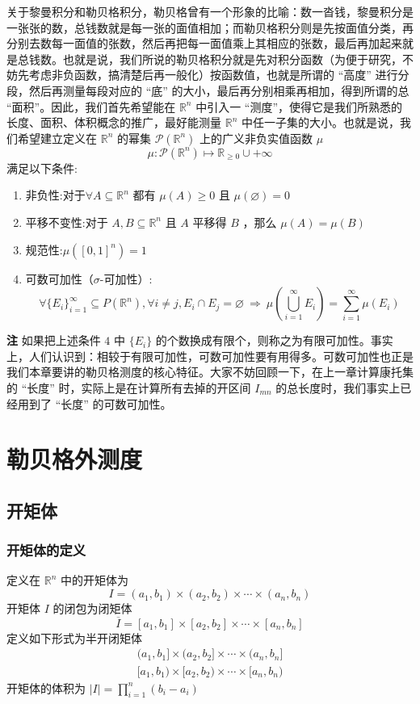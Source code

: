 \documentclass{ctexbook}
\newcommand{\R}{\mathbb{R}}
\newcommand{\ITEMS}{\begin{enumerate}[leftmargin=4em]}
\newcommand{\ITEME}{\end{enumerate}}
\begin{document}
关于黎曼积分和勒贝格积分，勒贝格曾有一个形象的比喻：数一沓钱，黎曼积分是一张张的数，总钱数就是每一张的面值相加；而勒贝格积分则是先按面值分类，再分别去数每一面值的张数，然后再把每一面值乘上其相应的张数，最后再加起来就是总钱数。也就是说，我们所说的勒贝格积分就是先对积分函数（为便于研究，不妨先考虑非负函数，搞清楚后再一般化）按函数值，也就是所谓的 “高度” 进行分段，然后再测量每段对应的 “底” 的大小，最后再分别相乘再相加，得到所谓的总 “面积”。因此，我们首先希望能在 $\R^n$ 中引入一 “测度”，使得它是我们所熟悉的长度、面积、体积概念的推广，最好能测量 $\R^n$ 中任一子集的大小。也就是说，我们希望建立定义在 $\R^n$ 的幂集 $\mathcal {P} (\R^n) $ 上的广义非负实值函数 $\mathcal {\mu}$
\[
\mathcal {\mu}:\mathcal {P} (\R^n)\mapsto \R_{\ge0} \cup {+\infty}
\]
满足以下条件:
\ITEMS
	\item 非负性:\quad 对于$\forall A \subseteq \R^n$ 都有 $\mathcal {\mu} (A) \ge 0$ 且 $\mathcal {\mu}(\varnothing) = 0$
	\item 平移不变性:\quad 对于 $A,B\subseteq \R^n$ 且 $A$ 平移得 $B$ ，那么 $\mathcal {\mu}(A) = \mathcal {\mu}(B)$
	\item 规范性:\quad $\mathcal {\mu}([0,1]^n)=1$
	\item 可数可加性（$\sigma$-可加性）:\quad 
\[
\forall \{E_i\}_{i=1}^\infty \subseteq P(\R^n), \forall i\neq j,E_i\cap E_j =\varnothing \ \Rightarrow\ \mathcal {\mu}(\bigcup_{i=1}^\infty E_i) = \sum_{i=1}^\infty \mathcal {\mu}(E_i) 
\]
\ITEME
{\bf 注} 如果把上述条件 $4$ 中 $\{E_i\}$ 的个数换成有限个，则称之为有限可加性。事实上，人们认识到：相较于有限可加性，可数可加性要有用得多。可数可加性也正是我们本章要讲的勒贝格测度的核心特征。大家不妨回顾一下，在上一章计算康托集的 “长度” 时，实际上是在计算所有去掉的开区间 $I_{mn}$ 的总长度时，我们事实上已经用到了 “长度” 的可数可加性。

\section{勒贝格外测度}

\subsection{开矩体}

\subsubsection{开矩体的定义}
定义在 $\R^n$ 中的开矩体为
\[
I = (a_1,b_1)\times(a_2,b_2)\times\cdots\times(a_n,b_n)
\]
开矩体 $I$ 的闭包为闭矩体 
\[
\overline I = [a_1,b_1]\times[a_2,b_2]\times\cdots\times[a_n,b_n]
\]
定义如下形式为半开闭矩体
\[
\begin{aligned}
	(a_1,b_1]\times(a_2,b_2]\times\cdots\times(a_n,b_n]\\
	[a_1,b_1)\times[a_2,b_2)\times\cdots\times[a_n,b_n)	
\end{aligned}
\]
开矩体的体积为 $\lvert I\rvert = \prod\limits_{i=1}^n (b_i-a_i)$
\end{document}
